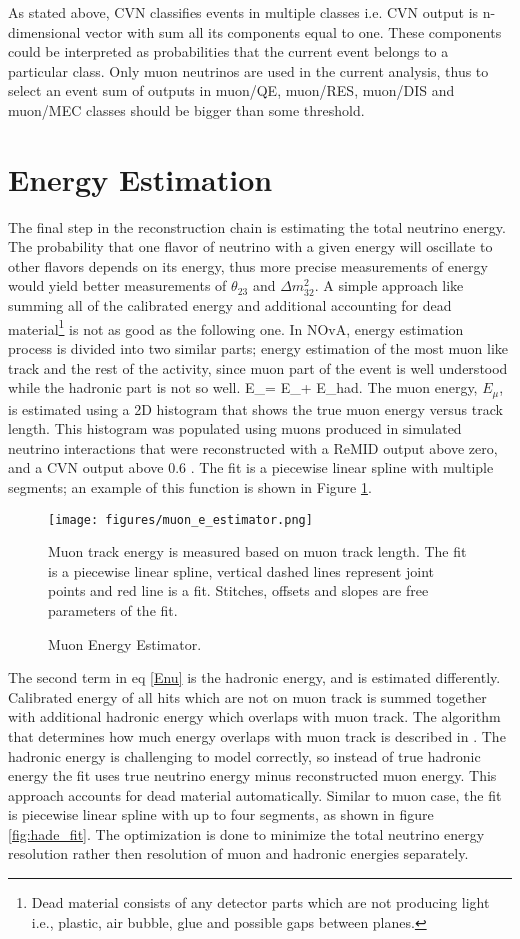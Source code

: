 As stated above, CVN classifies events in multiple classes i.e. CVN output is n-dimensional vector with sum all its 
components equal to one. These components could be interpreted as probabilities that the current event belongs 
to a particular class. Only muon neutrinos are used in the current analysis, thus to select an event sum of outputs 
in muon/QE, muon/RES, muon/DIS and muon/MEC classes should be bigger than some threshold.

\section{Energy Estimation} \label{energy_est_cont}
The final step in the reconstruction chain is estimating the total neutrino energy. The probability that one
flavor of neutrino with a given energy will oscillate to other flavors depends on its energy, thus more
precise measurements of energy would yield better measurements of $\theta_{23}$ and $\Delta m_{32}^2$.
A simple approach like summing all of the calibrated energy and additional accounting for dead 
material\footnote{Dead material consists of any detector parts which are not producing light i.e., plastic, air 
bubble, glue and possible gaps between planes.} is not as good as the following one. In NOvA, energy estimation 
process is divided into two similar parts; energy estimation of the most muon like track and the rest of the 
activity, since muon part of the event is well understood while the hadronic part is not so well.
\be
E_\nu = E_\mu + E_{had}.
\ee 
The muon energy, $E_{\mu}$, is estimated using a 2D histogram that shows the true muon energy versus track length.
This histogram was populated using muons produced in simulated neutrino interactions that were reconstructed with
a ReMID output above zero, and a CVN output above 0.6 \cite{energy_technote}. The fit is a piecewise linear spline
with multiple segments; an example of this function is shown in Figure \ref{fig:mue_fit}.
\begin{figure}[t]
\texttt{[image: figures/muon\_e\_estimator.png]}
\centering
\caption{Muon Energy Estimator.}
{Muon track energy is measured based on muon track length. The fit is a piecewise linear spline, vertical dashed
lines represent joint points and red line is a fit. Stitches, offsets and slopes are free parameters of the fit.}
\label{fig:mue_fit}
\end{figure}

The second term in eq \ref{Enu} is the hadronic energy, and is estimated differently. Calibrated energy of all hits 
which are not on muon track is summed together with additional hadronic energy which overlaps with muon track. 
The algorithm that determines how much energy overlaps with muon track is described in \cite{Kanika}. The hadronic
energy is challenging to model correctly, so instead of true hadronic energy the fit uses true neutrino energy minus
reconstructed muon energy. This approach accounts for dead material automatically. Similar to muon case, the fit 
is piecewise linear spline with up to four segments, as shown in figure \ref{fig:hade_fit}. The optimization is done
to minimize the total neutrino energy resolution rather then resolution of muon and hadronic energies separately. 

